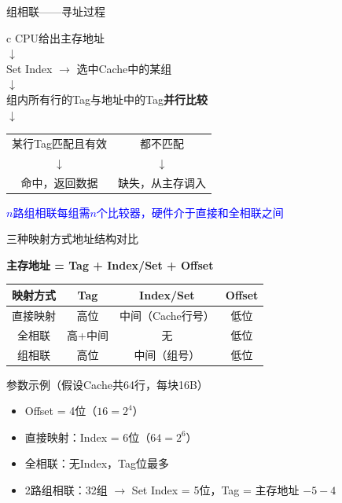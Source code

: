 \documentclass[10pt, aspectratio=169]{beamer}
\begin{document}
\begin{frame}{组相联——寻址过程}
    \begin{center}
        \begin{tabular}{c}
            CPU给出主存地址 \\
            $\downarrow$ \\
            Set Index $\to$ 选中Cache中的某组 \\
            $\downarrow$ \\
            组内所有行的Tag与地址中的Tag\textbf{并行比较} \\
            $\downarrow$ \\
            \begin{tabular}{c|c}
                某行Tag匹配且有效 & 都不匹配 \\
                $\downarrow$ & $\downarrow$ \\
                命中，返回数据 & 缺失，从主存调入 \\
            \end{tabular}
        \end{tabular}
    \end{center}
    \vspace{0.5em}
    \begin{center}
        \textcolor{blue}{$n$路组相联每组需$n$个比较器，硬件介于直接和全相联之间}
    \end{center}
\end{frame}

\begin{frame}[t]{三种映射方式地址结构对比}
    \begin{center}
        \textbf{主存地址 = Tag + Index/Set + Offset} \\
        \vspace{0.5em}
        \begin{tabular}{|c|c|c|c|}
            \hline
            \textbf{映射方式} & \textbf{Tag} & \textbf{Index/Set} & \textbf{Offset} \\
            \hline
            直接映射 & 高位 & 中间（Cache行号） & 低位 \\
            \hline
            全相联 & 高+中间 & 无 & 低位 \\
            \hline
            组相联 & 高位 & 中间（组号） & 低位 \\
            \hline
        \end{tabular}
    \end{center}
    \vspace{0.5em}
    \begin{exampleblock}{参数示例（假设Cache共64行，每块16B）}
        \begin{itemize}
            \item Offset = 4位（$16 = 2^4$）
            \item 直接映射：Index = 6位（$64 = 2^6$）
            \item 全相联：无Index，Tag位最多
            \item 2路组相联：32组 $\to$ Set Index = 5位，Tag = 主存地址 $- 5 - 4$
        \end{itemize}
    \end{exampleblock}
\end{frame}
\end{document}
